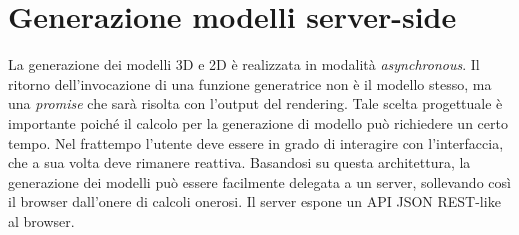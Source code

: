 \section{Generazione modelli server-side}
\label{sec:chapter_3_section_4}

\noindent
La generazione dei modelli 3D e 2D è realizzata in modalità \emph{asynchronous}.
Il ritorno dell'invocazione di una funzione generatrice non \`e il modello stesso,
ma una \emph{promise} che sarà risolta con l'output del rendering. Tale scelta progettuale \`e importante poich\'e il calcolo per la
generazione di modello pu\`o richiedere un certo tempo.
Nel frattempo l'utente deve essere in grado di interagire con l'interfaccia, che a sua volta deve rimanere reattiva.
Basandosi su questa architettura, la generazione dei modelli può essere facilmente delegata a un server,
sollevando così il browser dall'onere di calcoli onerosi. Il server espone un API JSON REST-like al browser.


\newpage
